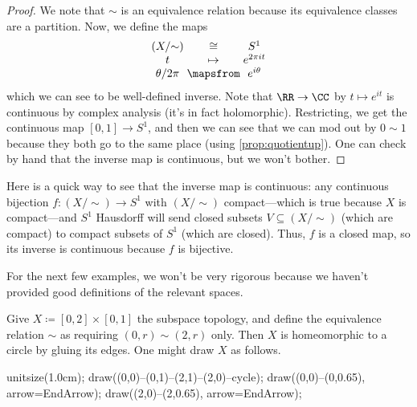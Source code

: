 \documentclass[../notes.tex]{subfiles}
\begin{document}
\begin{proof}
	We note that $\sim$ is an equivalence relation because its equivalence classes are a partition. Now, we define the maps
	\[\arraycolsep=1.4pt\begin{array}{ccc}
		(X/{\sim}) &\cong& S^1 \\
		t &\mapsto& e^{2\pi it} \\
		\theta/2\pi &\mapsfrom& e^{i\theta}
	\end{array}\]
	which we can see to be well-defined inverse. Note that $\RR\to\CC$ by $t\mapsto e^{it}$ is continuous by complex analysis (it's in fact holomorphic). Restricting, we get the continuous map $[0,1]\to S^1$, and then we can see that we can mod out by $0\sim1$ because they both go to the same place (using \autoref{prop:quotientup}). One can check by hand that the inverse map is continuous, but we won't bother.
\end{proof}
\begin{remark}[Nir]
	Here is a quick way to see that the inverse map is continuous: any continuous bijection $f\colon(X/{\sim})\to S^1$ with $(X/{\sim})$ compact---which is true because $X$ is compact---and $S^1$ Hausdorff will send closed subsets $V\subseteq(X/{\sim})$ (which are compact) to compact subsets of $S^1$ (which are closed). Thus, $f$ is a closed map, so its inverse is continuous because $f$ is bijective.
\end{remark}
For the next few examples, we won't be very rigorous because we haven't provided good definitions of the relevant spaces.
\begin{ex} \label{ex:cylinder}
	Give $X\coloneqq[0,2]\times[0,1]$ the subspace topology, and define the equivalence relation $\sim$ as requiring $(0,r)\sim(2,r)$ only. Then $X$ is homeomorphic to a circle by gluing its edges. One might draw $X$ as follows.
	\begin{center}
		\begin{asy}
			unitsize(1.0cm);
			draw((0,0)--(0,1)--(2,1)--(2,0)--cycle);
			draw((0,0)--(0,0.65), arrow=EndArrow);
			draw((2,0)--(2,0.65), arrow=EndArrow);
		\end{asy}
	\end{center}
\end{ex}
\end{document}
